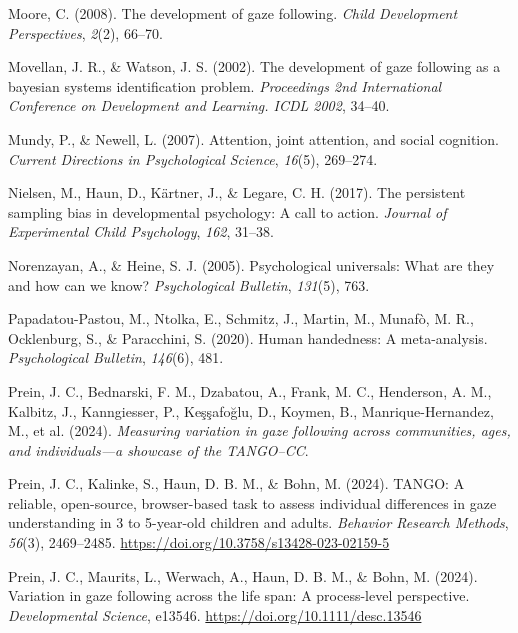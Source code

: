 \documentclass[
  man,floatsintext]{apa7}
\newlength{\cslhangindent}
\newlength{\cslentryspacingunit} %
\newenvironment{CSLReferences}[2] %
 {%
  \setlength{\parindent}{0pt}
  \ifodd #1
  \let\oldpar\par
  \def\par{\hangindent=\cslhangindent\oldpar}
  \fi
  \setlength{\parskip}{#2\cslentryspacingunit}
 }%
 {}
\begin{document}
\begin{CSLReferences}{1}{0}
\leavevmode{}%
Moore, C. (2008). The development of gaze following. \emph{Child Development Perspectives}, \emph{2}(2), 66--70.

\leavevmode{}%
Movellan, J. R., \& Watson, J. S. (2002). The development of gaze following as a bayesian systems identification problem. \emph{Proceedings 2nd International Conference on Development and Learning. ICDL 2002}, 34--40.

\leavevmode{}%
Mundy, P., \& Newell, L. (2007). Attention, joint attention, and social cognition. \emph{Current Directions in Psychological Science}, \emph{16}(5), 269--274.

\leavevmode{}%
Nielsen, M., Haun, D., Kärtner, J., \& Legare, C. H. (2017). The persistent sampling bias in developmental psychology: A call to action. \emph{Journal of Experimental Child Psychology}, \emph{162}, 31--38.

\leavevmode{}%
Norenzayan, A., \& Heine, S. J. (2005). Psychological universals: What are they and how can we know? \emph{Psychological Bulletin}, \emph{131}(5), 763.

\leavevmode{}%
Papadatou-Pastou, M., Ntolka, E., Schmitz, J., Martin, M., Munafò, M. R., Ocklenburg, S., \& Paracchini, S. (2020). Human handedness: A meta-analysis. \emph{Psychological Bulletin}, \emph{146}(6), 481.

\leavevmode{}%
Prein, J. C., Bednarski, F. M., Dzabatou, A., Frank, M. C., Henderson, A. M., Kalbitz, J., Kanngiesser, P., Keşşafoğlu, D., Koymen, B., Manrique-Hernandez, M., et al. (2024). \emph{Measuring variation in gaze following across communities, ages, and individuals---a showcase of the TANGO--CC}.

\leavevmode{}%
Prein, J. C., Kalinke, S., Haun, D. B. M., \& Bohn, M. (2024). {TANGO}: {A} reliable, open-source, browser-based task to assess individual differences in gaze understanding in 3 to 5-year-old children and adults. \emph{Behavior Research Methods}, \emph{56}(3), 2469--2485. \url{https://doi.org/10.3758/s13428-023-02159-5}

\leavevmode{}%
Prein, J. C., Maurits, L., Werwach, A., Haun, D. B. M., \& Bohn, M. (2024). Variation in gaze following across the life span: {A} process-level perspective. \emph{Developmental Science}, e13546. \url{https://doi.org/10.1111/desc.13546}


\end{CSLReferences}
\end{document}
